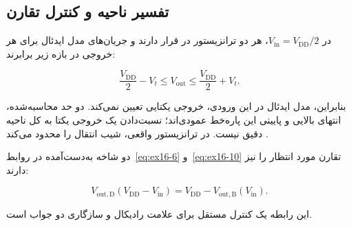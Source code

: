 \subsection*{تفسیر ناحیه  و کنترل تقارن}

در \(V_{\mathrm{in}}=V_{\mathrm{DD}}/2\)، هر دو ترانزیستور در  قرار دارند و جریان‌های مدل ایدئال برای هر خروجی در بازه زیر برابرند:

\nopagebreak[3]
\begin{equation}\label{eq:ex16-12}
\frac{V_{\mathrm{DD}}}{2}-V_t
\le V_{\mathrm{out}}\le
\frac{V_{\mathrm{DD}}}{2}+V_t.
\end{equation}

بنابراین، مدل  ایدئال در این ورودی، خروجی یکتایی تعیین نمی‌کند. دو حد محاسبه‌شده، انتهای بالایی و پایینی این پاره‌خط عمودی‌اند؛ نسبت‌دادن یک خروجی یکتا به کل ناحیه  دقیق نیست.  در ترانزیستور واقعی، شیب انتقال را محدود می‌کند \cite[صفحه چاپی ۸۸]{weste}.

دو شاخه به‌دست‌آمده در روابط~\eqref{eq:ex16-6} و~\eqref{eq:ex16-10} تقارن مورد انتظار را نیز دارند:

\nopagebreak[3]
\begin{equation}\label{eq:ex16-13}
V_{\mathrm{out,D}}(V_{\mathrm{DD}}-V_{\mathrm{in}})
=V_{\mathrm{DD}}-V_{\mathrm{out,B}}(V_{\mathrm{in}}).
\end{equation}

این رابطه یک کنترل مستقل برای علامت رادیکال و سازگاری دو جواب است.

